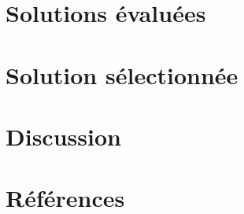 \documentclass[12pt,a4paper]{article}
\begin{document}
\section{Solutions évaluées}




\section{Solution sélectionnée}



\section{Discussion}


\section{Références}

\end{document}
